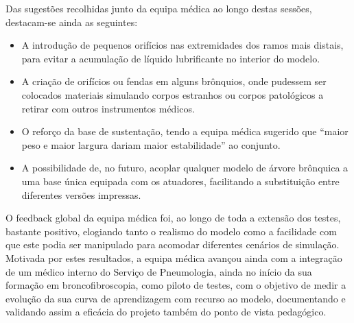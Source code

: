 Das sugestões recolhidas junto da equipa médica ao longo destas sessões, destacam-se ainda as seguintes:
\begin{itemize}
  \item A introdução de pequenos orifícios nas extremidades dos ramos mais distais, para evitar a acumulação de líquido lubrificante no interior do modelo.
  \item A criação de orifícios ou fendas em alguns brônquios, onde pudessem ser colocados materiais simulando corpos estranhos ou corpos patológicos a retirar com outros instrumentos médicos.
  \item O reforço da base de sustentação, tendo a equipa médica sugerido que ``maior peso e maior largura dariam maior estabilidade'' ao conjunto.
  \item A possibilidade de, no futuro, acoplar qualquer modelo de árvore brônquica a uma base única equipada com os atuadores, facilitando a substituição entre diferentes versões impressas.
\end{itemize}

O feedback global da equipa médica foi, ao longo de toda a extensão dos testes, bastante positivo, elogiando tanto o realismo do modelo como a facilidade com que este podia ser manipulado para acomodar diferentes cenários de simulação. Motivada por estes resultados, a equipa médica avançou ainda com a integração de um médico interno do Serviço de Pneumologia, ainda no início da sua formação em broncofibroscopia, como piloto de testes, com o objetivo de medir a evolução da sua curva de aprendizagem com recurso ao modelo, documentando e validando assim a eficácia do projeto também do ponto de vista pedagógico.
